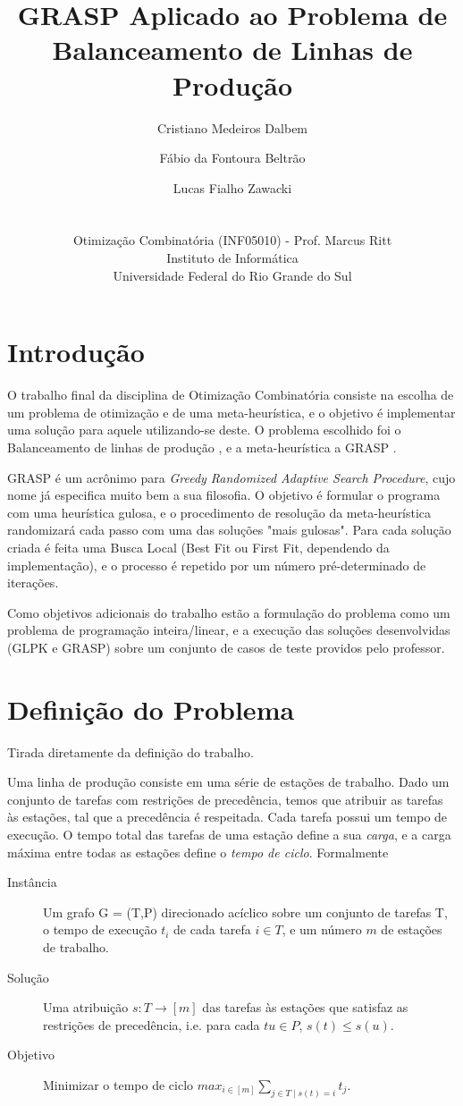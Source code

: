 \documentclass{report}
\title{GRASP Aplicado ao Problema de Balanceamento de Linhas de Produção}
\author{Cristiano Medeiros Dalbem \and Fábio da Fontoura Beltrão \and Lucas Fialho Zawacki\\
\\
\\
\small Otimização Combinatória (INF05010) - Prof. Marcus Ritt\\
\small Instituto de Informática\\[-0.8ex]
\small Universidade Federal do Rio Grande do Sul
}
\begin{document}
\maketitle
\tableofcontents

\chapter{Introdução}

O trabalho final da disciplina de Otimização Combinatória consiste na escolha de um problema de otimização e de uma meta-heurística, e o objetivo é implementar uma solução para aquele utilizando-se deste. O problema escolhido foi o Balanceamento de linhas de produção \cite{salbp}, e a meta-heurística a GRASP \cite{grasp}.

GRASP é um acrônimo para \emph{Greedy Randomized Adaptive Search Procedure}, cujo nome já especifica muito bem a sua filosofia. O objetivo é formular o programa com uma heurística gulosa, e o procedimento de resolução da meta-heurística randomizará cada passo com uma das soluções "mais gulosas". Para cada solução criada é feita uma Busca Local (Best Fit ou First Fit, dependendo da implementação), e o processo é repetido por um número pré-determinado de iterações.

Como objetivos adicionais do trabalho estão a formulação do problema como um problema de programação inteira/linear, e a execução das soluções desenvolvidas (GLPK e GRASP) sobre um conjunto de casos de teste providos pelo professor.

\chapter{Definição do Problema}

Tirada diretamente da definição do trabalho.

Uma linha de produção consiste em uma série de estações de trabalho. Dado um conjunto de tarefas com restrições de
precedência, temos que atribuir as tarefas às estações, tal que a precedência é respeitada. Cada tarefa possui um tempo
de execução. O tempo total das tarefas de uma estação define a sua \emph{carga}, e a carga máxima entre todas as
estações define o \emph{tempo de ciclo}. Formalmente

\begin{description}
 \item [Instância] Um grafo G = (T,P) direcionado acíclico sobre um conjunto de tarefas T, o tempo de execução $t_i$ de
cada tarefa $i \in T$, e um número $m$ de estações de trabalho.

 \item [Solução] Uma atribuição $s : T \rightarrow [m]$ das tarefas às estações que satisfaz as restrições de
precedência, i.e. para cada $tu \in P$, $s(t) \leq s(u)$.

 \item [Objetivo] Minimizar o tempo de ciclo  $max_{i\in[m]}\sum_{j\in T\mid s(t)=i}t_j$.
\end{description}
\end{document}
